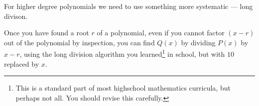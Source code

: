 
For higher degree polynomials we need to use something more systematic --- long
divison.
\begin{trick}
Once you have found a root $r$ of a polynomial, even if you cannot factor
$(x-r)$ out of the polynomial by inspection, you can find $Q(x)$
by dividing $P(x)$ by $x-r$, using the long division algorithm you learned\footnote{This
is a standard part of most highschool mathematics curricula, but perhaps not all. You
should revise this carefully.} in school, but with $10$ replaced by $x$.
\end{trick}

